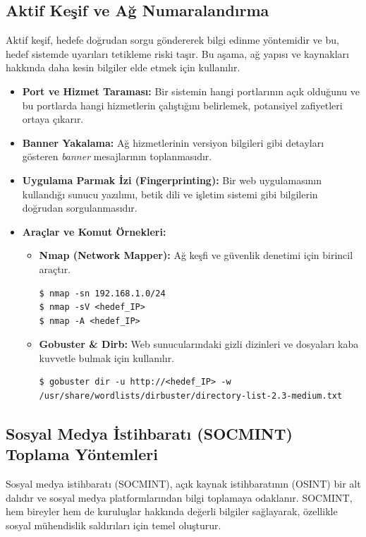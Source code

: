 \subsection{Aktif Keşif ve Ağ Numaralandırma}
Aktif keşif, hedefe doğrudan sorgu göndererek bilgi edinme yöntemidir ve bu, hedef sistemde uyarıları tetikleme riski taşır. Bu aşama, ağ yapısı ve kaynakları hakkında daha kesin bilgiler elde etmek için kullanılır.
\begin{itemize}
\item \textbf{Port ve Hizmet Taraması:} Bir sistemin hangi portlarının açık olduğunu ve bu portlarda hangi hizmetlerin çalıştığını belirlemek, potansiyel zafiyetleri ortaya çıkarır.
\item \textbf{Banner Yakalama:} Ağ hizmetlerinin versiyon bilgileri gibi detayları gösteren \textit{banner} mesajlarının toplanmasıdır.
\item \textbf{Uygulama Parmak İzi (Fingerprinting):} Bir web uygulamasının kullandığı sunucu yazılımı, betik dili ve işletim sistemi gibi bilgilerin doğrudan sorgulanmasıdır.
\item \textbf{Araçlar ve Komut Örnekleri:}
\begin{itemize}
    \item \textbf{Nmap (Network Mapper):} Ağ keşfi ve güvenlik denetimi için birincil araçtır.
    \begin{verbatim}
$ nmap -sn 192.168.1.0/24
$ nmap -sV <hedef_IP>
$ nmap -A <hedef_IP>
    \end{verbatim}
    \item \textbf{Gobuster \& Dirb:} Web sunucularındaki gizli dizinleri ve dosyaları kaba kuvvetle bulmak için kullanılır.
    \begin{verbatim}
$ gobuster dir -u http://<hedef_IP> -w /usr/share/wordlists/dirbuster/directory-list-2.3-medium.txt
    \end{verbatim}
\end{itemize}
\end{itemize}

\subsection{Sosyal Medya İstihbaratı (SOCMINT) Toplama Yöntemleri}

Sosyal medya istihbaratı (SOCMINT), açık kaynak istihbaratının (OSINT) bir alt dalıdır ve sosyal medya platformlarından bilgi toplamaya odaklanır. SOCMINT, hem bireyler hem de kuruluşlar hakkında değerli bilgiler sağlayarak, özellikle sosyal mühendislik saldırıları için temel oluşturur.

